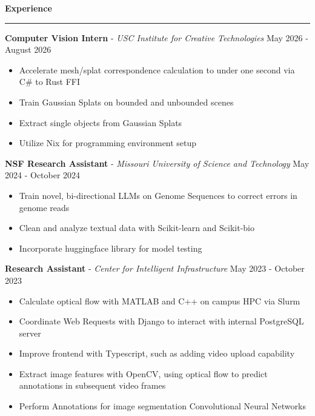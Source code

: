 \documentclass[11pt]{article}
\begin{document}
\textbf{Experience}\par
\vspace{-12pt}
\noindent\rule{\textwidth}{0.4pt}

\textbf{Computer Vision Intern} - \textsl{USC Institute for Creative Technologies} \hfill May 2026 - August 2026
\begin{itemize}[noitemsep, topsep=0pt, partopsep=0pt, parsep=0pt, itemsep=0pt]
    \small
    \item Accelerate mesh/splat correspondence calculation to under one second via C\# to Rust FFI
    \item Train Gaussian Splats on bounded and unbounded scenes
    \item Extract single objects from Gaussian Splats
    \item Utilize Nix for programming environment setup
\end{itemize}


\textbf{NSF Research Assistant} - \textsl{Missouri University of Science and Technology} \hfill May 2024 - October 2024
\begin{itemize}[noitemsep, topsep=0pt, partopsep=0pt, parsep=0pt, itemsep=0pt]
    \small
    \item Train novel, bi-directional LLMs on Genome Sequences to correct errors in genome reads
    \item Clean and analyze textual data with Scikit-learn and Scikit-bio
    \item Incorporate huggingface library for model testing
\end{itemize}

\textbf{Research Assistant} - \textsl{Center for Intelligent Infrastructure} \hfill May 2023 - October 2023
\begin{itemize}[noitemsep, topsep=0pt, partopsep=0pt, parsep=0pt, itemsep=0pt]
    \small
    \item Calculate optical flow with MATLAB and C++ on campus HPC via Slurm
    \item Coordinate Web Requests with Django to interact with internal PostgreSQL server
    \item Improve frontend with Typescript, such as adding video upload capability
    \item Extract image features with OpenCV, using optical flow to predict annotations in subsequent video frames
    \item Perform Annotations for image segmentation Convolutional Neural Networks
\end{itemize}
\end{document}
